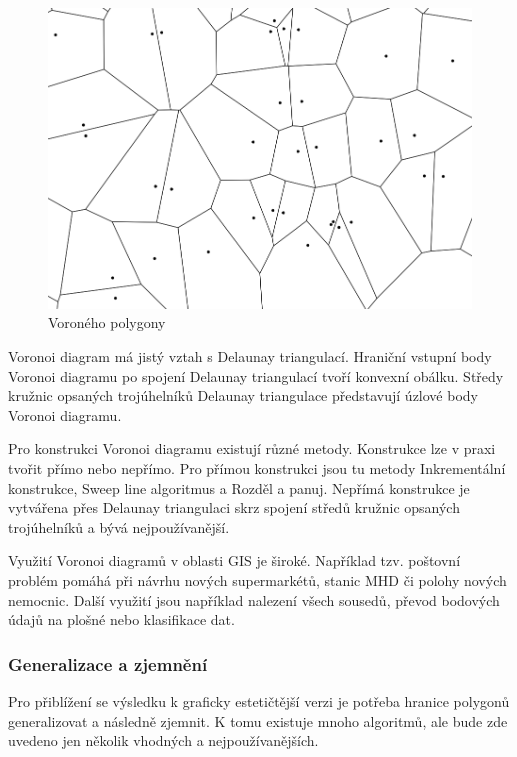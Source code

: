 \begin{figure}[H] \centering
    \includegraphics[width=400pt]{./pictures/voronoi.png}
    \caption[Voroného polygony]{Voroného polygony}
	\label{fig:voronoi}              
\end{figure}   

Voronoi diagram má jistý vztah s Delaunay triangulací. Hraniční vstupní body
Voronoi diagramu po spojení Delaunay triangulací tvoří konvexní obálku.
Středy kružnic opsaných trojúhelníků Delaunay triangulace představují úzlové body
Voronoi diagramu.

Pro konstrukci Voronoi diagramu existují různé metody. Konstrukce lze v praxi tvořit přímo nebo nepřímo.
Pro přímou konstrukci jsou tu metody Inkrementální konstrukce, Sweep line algoritmus a
Rozděl a panuj. Nepřímá konstrukce je vytvářena přes Delaunay triangulaci skrz spojení středů
kružnic opsaných trojúhelníků a bývá nejpoužívanější. 

Využití Voronoi diagramů v oblasti GIS je široké. Například tzv. poštovní problém
pomáhá při návrhu nových supermarkétů, stanic MHD či polohy nových nemocnic.
Další využití jsou například nalezení všech sousedů, převod bodových údajů na plošné
nebo klasifikace dat. \cite{bayer-voronoi}

\subsubsection{Generalizace a zjemnění}

Pro přiblížení se výsledku k graficky estetičtější verzi je potřeba hranice polygonů
generalizovat a následně zjemnit. K tomu existuje mnoho algoritmů, ale bude zde uvedeno
jen několik vhodných a nejpoužívanějších.

